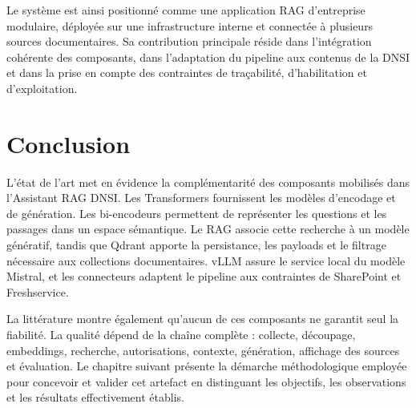 Le système est ainsi positionné comme une application RAG d'entreprise modulaire, déployée sur une infrastructure interne et connectée à plusieurs sources documentaires. Sa contribution principale réside dans l'intégration cohérente des composants, dans l'adaptation du pipeline aux contenus de la DNSI et dans la prise en compte des contraintes de traçabilité, d'habilitation et d'exploitation.

\section{Conclusion}

L'état de l'art met en évidence la complémentarité des composants mobilisés dans l'Assistant RAG DNSI. Les Transformers fournissent les modèles d'encodage et de génération. Les bi-encodeurs permettent de représenter les questions et les passages dans un espace sémantique. Le RAG associe cette recherche à un modèle génératif, tandis que Qdrant apporte la persistance, les payloads et le filtrage nécessaire aux collections documentaires. vLLM assure le service local du modèle Mistral, et les connecteurs adaptent le pipeline aux contraintes de SharePoint et Freshservice.

La littérature montre également qu'aucun de ces composants ne garantit seul la fiabilité. La qualité dépend de la chaîne complète : collecte, découpage, embeddings, recherche, autorisations, contexte, génération, affichage des sources et évaluation. Le chapitre suivant présente la démarche méthodologique employée pour concevoir et valider cet artefact en distinguant les objectifs, les observations et les résultats effectivement établis.
